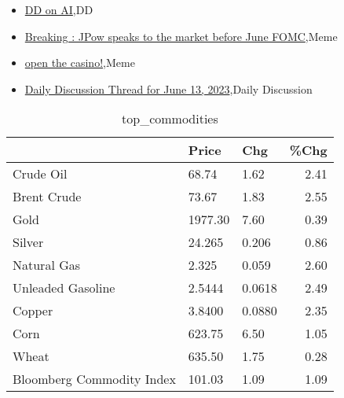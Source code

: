 \documentclass{article}%
\begin{document}
%
\begin{itemize}%
\item%
\href{https://reddit.com/r/wallstreetbets/comments/148ehjh/dd\_on\_ai/}{DD on AI},DD%
\item%
\href{https://reddit.com/r/wallstreetbets/comments/148crbz/breaking\_jpow\_speaks\_to\_the\_market\_before\_june/}{ Breaking  : JPow speaks to the market before June FOMC},Meme%
\item%
\href{https://reddit.com/r/wallstreetbets/comments/148cchm/open\_the\_casino/}{open the casino!},Meme%
\item%
\href{https://reddit.com/r/wallstreetbets/comments/148bplr/daily\_discussion\_thread\_for\_june\_13\_2023/}{Daily Discussion Thread for June 13, 2023},Daily Discussion%
\end{itemize}%


\begin{table}[htbp]%
\caption{top\_commodities}%
\centering%
\begin{adjustbox}{width=1\textwidth}%
\begin{tabular}{lllr}
\toprule
                          &   Price &    Chg &  \%Chg \\
\midrule
               Crude Oil  &   68.74 &   1.62 &  2.41 \\
             Brent Crude  &   73.67 &   1.83 &  2.55 \\
                    Gold  & 1977.30 &   7.60 &  0.39 \\
                  Silver  &  24.265 &  0.206 &  0.86 \\
             Natural Gas  &   2.325 &  0.059 &  2.60 \\
       Unleaded Gasoline  &  2.5444 & 0.0618 &  2.49 \\
                  Copper  &  3.8400 & 0.0880 &  2.35 \\
                    Corn  &  623.75 &   6.50 &  1.05 \\
                   Wheat  &  635.50 &   1.75 &  0.28 \\
Bloomberg Commodity Index &  101.03 &   1.09 &  1.09 \\
\bottomrule
\end{tabular}
%
\end{adjustbox}%
\end{table}

%
\end{document}
